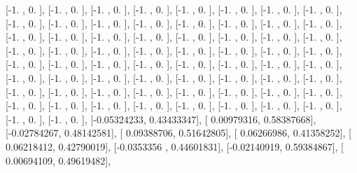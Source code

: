 \documentclass{article}
\begin{document}
       [-1.        ,  0.        ],
       [-1.        ,  0.        ],
       [-1.        ,  0.        ],
       [-1.        ,  0.        ],
       [-1.        ,  0.        ],
       [-1.        ,  0.        ],
       [-1.        ,  0.        ],
       [-1.        ,  0.        ],
       [-1.        ,  0.        ],
       [-1.        ,  0.        ],
       [-1.        ,  0.        ],
       [-1.        ,  0.        ],
       [-1.        ,  0.        ],
       [-1.        ,  0.        ],
       [-1.        ,  0.        ],
       [-1.        ,  0.        ],
       [-1.        ,  0.        ],
       [-1.        ,  0.        ],
       [-1.        ,  0.        ],
       [-1.        ,  0.        ],
       [-1.        ,  0.        ],
       [-1.        ,  0.        ],
       [-1.        ,  0.        ],
       [-1.        ,  0.        ],
       [-1.        ,  0.        ],
       [-1.        ,  0.        ],
       [-1.        ,  0.        ],
       [-1.        ,  0.        ],
       [-1.        ,  0.        ],
       [-1.        ,  0.        ],
       [-1.        ,  0.        ],
       [-1.        ,  0.        ],
       [-1.        ,  0.        ],
       [-1.        ,  0.        ],
       [-1.        ,  0.        ],
       [-1.        ,  0.        ],
       [-1.        ,  0.        ],
       [-1.        ,  0.        ],
       [-1.        ,  0.        ],
       [-1.        ,  0.        ],
       [-1.        ,  0.        ],
       [-1.        ,  0.        ],
       [-1.        ,  0.        ],
       [-1.        ,  0.        ],
       [-1.        ,  0.        ],
       [-1.        ,  0.        ],
       [-1.        ,  0.        ],
       [-1.        ,  0.        ],
       [-1.        ,  0.        ],
       [-1.        ,  0.        ],
       [-1.        ,  0.        ],
       [-1.        ,  0.        ],
       [-1.        ,  0.        ],
       [-1.        ,  0.        ],
       [-1.        ,  0.        ],
       [-1.        ,  0.        ],
       [-1.        ,  0.        ],
       [-1.        ,  0.        ],
       [-1.        ,  0.        ],
       [-1.        ,  0.        ],
       [-1.        ,  0.        ],
       [-1.        ,  0.        ],
       [-1.        ,  0.        ],
       [-1.        ,  0.        ],
       [-1.        ,  0.        ],
       [-1.        ,  0.        ],
       [-0.05324233,  0.43433347],
       [ 0.00979316,  0.58387668],
       [-0.02784267,  0.48142581],
       [ 0.09388706,  0.51642805],
       [ 0.06266986,  0.41358252],
       [ 0.06218412,  0.42790019],
       [-0.0353356 ,  0.44601831],
       [-0.02140919,  0.59384867],
       [ 0.00694109,  0.49619482],
\end{document}
